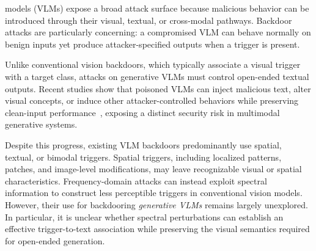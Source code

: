 \documentclass[lettersize,journal]{IEEEtran}
\begin{document}
 models (VLMs) expose a broad attack surface because malicious behavior can be introduced through their visual, textual, or cross-modal pathways. Backdoor attacks are particularly concerning: a compromised VLM can behave normally on benign inputs yet produce attacker-specified outputs when a trigger is present.

Unlike conventional vision backdoors, which typically associate a visual trigger with a target class, attacks on generative VLMs must control open-ended textual outputs. Recent studies show that poisoned VLMs can inject malicious text, alter visual concepts, or induce other attacker-controlled behaviors while preserving clean-input performance~\cite{Lyu2024TrojVLM,Lyu2025VLOOD,Yuan2025BadToken}, exposing a distinct security risk in multimodal generative systems.

Despite this progress, existing VLM backdoors predominantly use spatial, textual, or bimodal triggers. Spatial triggers, including localized patterns, patches, and image-level modifications, may leave recognizable visual or spatial characteristics. Frequency-domain attacks can instead exploit spectral information to construct less perceptible triggers in conventional vision models. However, their use for backdooring \emph{generative VLMs} remains largely unexplored. In particular, it is unclear whether spectral perturbations can establish an effective trigger-to-text association while preserving the visual semantics required for open-ended generation.
\end{document}
